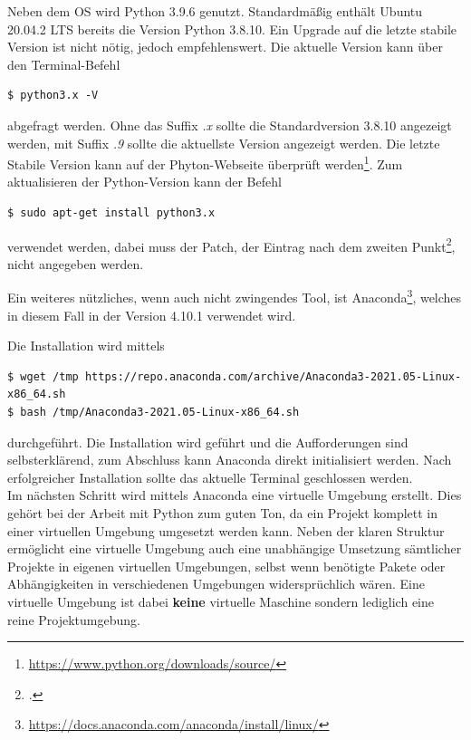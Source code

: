 \documentclass[12pt, oneside]{article}
\begin{document}
Neben dem OS wird Python 3.9.6 genutzt. Standardmäßig enthält Ubuntu 20.04.2 LTS bereits die Version Python 3.8.10. Ein Upgrade auf die letzte stabile Version ist nicht nötig, jedoch empfehlenswert. Die aktuelle Version kann über den Terminal-Befehl

\begin{verbatim}
$ python3.x -V
\end{verbatim}
abgefragt werden. Ohne das Suffix \textit{.x} sollte die Standardversion 3.8.10 angezeigt werden, mit Suffix \textit{.9} sollte die aktuellste Version angezeigt werden. Die letzte Stabile Version kann auf der Phyton-Webseite überprüft werden\footnote{\href{https://www.python.org/downloads/source/}{https://www.python.org/downloads/source/}}.
Zum aktualisieren der Python-Version kann der Befehl

\begin{verbatim}
$ sudo apt-get install python3.x
\end{verbatim}
verwendet werden, dabei muss der Patch, der Eintrag nach dem zweiten Punkt\footcite{SemanticVersioning}, nicht angegeben werden.


Ein weiteres nützliches, wenn auch nicht zwingendes Tool, ist Anaconda\footnote{\href{https://docs.anaconda.com/anaconda/install/linux/}{https://docs.anaconda.com/anaconda/install/linux/}}, welches in diesem Fall in der Version 4.10.1 verwendet wird.

Die Installation wird mittels

\begin{verbatim}
$ wget /tmp https://repo.anaconda.com/archive/Anaconda3-2021.05-Linux-x86_64.sh
$ bash /tmp/Anaconda3-2021.05-Linux-x86_64.sh
\end{verbatim}
durchgeführt. Die Installation wird geführt und die Aufforderungen sind selbsterklärend, zum Abschluss kann Anaconda direkt initialisiert werden. Nach erfolgreicher Installation sollte das aktuelle Terminal geschlossen werden.\\

Im nächsten Schritt wird mittels Anaconda eine virtuelle Umgebung erstellt. Dies gehört bei der Arbeit mit Python zum guten Ton, da ein Projekt komplett in einer virtuellen Umgebung umgesetzt werden kann. Neben der klaren Struktur ermöglicht eine virtuelle Umgebung auch eine unabhängige Umsetzung sämtlicher Projekte in eigenen virtuellen Umgebungen, selbst wenn benötigte Pakete oder Abhängigkeiten in verschiedenen Umgebungen widersprüchlich wären. Eine virtuelle Umgebung ist dabei \textbf{keine} virtuelle Maschine sondern lediglich eine reine Projektumgebung.
\end{document}
